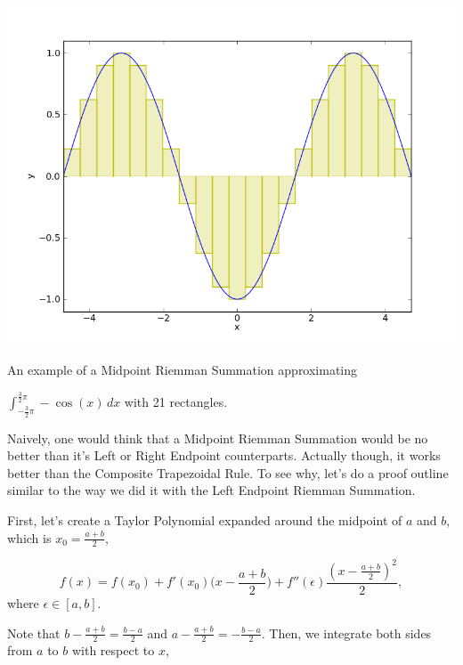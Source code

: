 \documentclass[12pt]{article}
\newcommand{\newLine}{\vspace{5mm}}
\newcommand{\integral}[3]{\text{$\int^{#2}_{#1} #3\,dx$}}
\begin{document}
\begin{center} \includegraphics[scale = 0.5]{cosMidpointRiemman.png} 

\small An example of a Midpoint Riemman Summation approximating 

$\integral{-\frac{3}{2}\pi}{\frac{3}{2}\pi}{-\cos(x)}$ with 21 rectangles.\normalsize
\end{center}

Naively, one would think that a Midpoint Riemman Summation would be no better than it's Left or Right Endpoint counterparts. Actually though, it works better than the Composite Trapezoidal Rule. To see why, let's do a proof outline similar to the way we did it with the Left Endpoint Riemman Summation.

First, let's create a Taylor Polynomial expanded around the midpoint of $a$ and $b$, which is $x_0=\frac{a+b}{2}$,

\begin{equation*} f(x) = f(x_0) + f'(x_0)\Big(x - \frac{a+b}{2}\Big) + f''(\epsilon)\frac{(x - \frac{a+b}{2})^2}{2},\end{equation*}
where $\epsilon\in[a,b]$.

\newLine\noindent Note that $b - \frac{a+b}{2}=\frac{b-a}{2}$ and $a - \frac{a+b}{2}=-\frac{b-a}{2}$. Then, we integrate both sides from $a$ to $b$ with respect to $x$,
\end{document}

